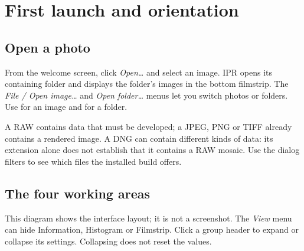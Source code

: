 \chapter{First launch and orientation}
\label{chap:demarrage}
\section{Open a photo}
From the welcome screen, click \emph{Open…} and select an image.
IPR opens its containing folder and displays the folder's images in the bottom
filmstrip. The \emph{File / Open image…} and \emph{Open folder…} menus let you
switch photos or folders. Use  for an image and
 for a folder.

A RAW contains data that must be developed; a JPEG, PNG or TIFF already contains
a rendered image. A DNG can contain different kinds of data: its extension alone
does not establish that it contains a RAW mosaic. Use the dialog filters to see
which files the installed build offers.

\section{The four working areas}
\begin{center}
\end{center}
This diagram shows the interface layout; it is not a screenshot.
The \emph{View} menu can hide Information, Histogram or Filmstrip.
Click a group header to expand or collapse its settings. Collapsing does not
reset the values.

